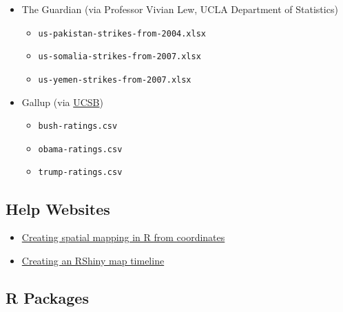 \documentclass[
]{article}
\providecommand{\tightlist}{%
  \setlength{\itemsep}{0pt}\setlength{\parskip}{0pt}}
\begin{document}
\begin{itemize}
\tightlist
\item
  The Guardian (via Professor Vivian Lew, UCLA Department of Statistics)

  \begin{itemize}
  \tightlist
  \item
    \texttt{us-pakistan-strikes-from-2004.xlsx}
  \item
    \texttt{us-somalia-strikes-from-2007.xlsx}
  \item
    \texttt{us-yemen-strikes-from-2007.xlsx}
  \end{itemize}
\item
  Gallup (via
  \href{https://www.presidency.ucsb.edu/statistics/data/presidential-job-approval-all-data}{UCSB})

  \begin{itemize}
  \tightlist
  \item
    \texttt{bush-ratings.csv}
  \item
    \texttt{obama-ratings.csv}
  \item
    \texttt{trump-ratings.csv}
  \end{itemize}
\end{itemize}

\hypertarget{help-websites}{%
\subsection{Help Websites}\label{help-websites}}

\begin{itemize}
\tightlist
\item
  \href{https://stackoverflow.com/questions/14334970/convert-latitude-and-longitude-coordinates-to-country-name-in-r}{Creating
  spatial mapping in R from coordinates}
\item
  \href{https://towardsdatascience.com/eye-catching-animated-maps-in-r-a-simple-introduction-3559d8c33be1}{Creating
  an RShiny map timeline}
\end{itemize}

\hypertarget{r-packages}{%
\subsection{R Packages}\label{r-packages}}
\end{document}
